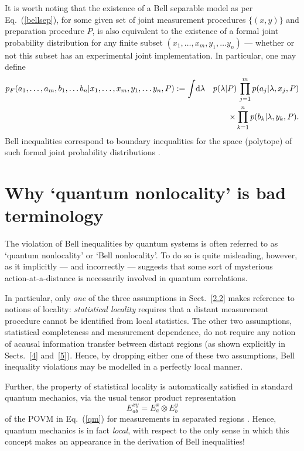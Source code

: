 \documentclass[graybox]{svmult}
\begin{document}
It is worth noting that the existence of a Bell separable model as per Eq.~(\ref{bellsep}), for some given set of joint measurement procedures $\{(x,y)\}$ and preparation procedure $P$, is also equivalent to the existence of a formal joint probability distribution for any finite subset $(x_1,\dots,x_m,y_1,\dots y_n)$ --- whether or not this subset has an experimental joint implementation.  In particular, one  may define \cite{fine}
\begin{eqnarray} \nonumber
p_F(a_1,\dots,a_m,b_1,\dots b_n|x_1,\dots,x_m,y_1,\dots y_n,P) := \int &\mathrm{d} \lambda& p(\lambda|P)\, \prod_{j=1}^m p(a_j|\lambda,x_j,P) \\
&~&~\times\prod_{k=1}^n p(b_k|\lambda,y_k,P) .
\end{eqnarray}
Bell inequalities correspond to boundary inequalities for the space (polytope) of such formal joint probability distributions \cite{bellreview,fineprl,garg,pit}.

\section{Why `quantum nonlocality' is bad terminology}
\label{3}

The violation of Bell inequalities by quantum systems is often referred to as `quantum nonlocality' or `Bell nonlocality'. To do so is quite misleading, however, as it implicitly --- and incorrectly --- suggests that some sort of mysterious action-at-a-distance is necessarily involved in quantum correlations.

In particular, only {\it one} of the three assumptions in Sect.~\ref{2.2} makes reference to notions of locality: {\it statistical locality} requires that a distant measurement procedure cannot be identified from local statistics. The other two assumptions, statistical completeness and measurement dependence, do not require any notion of acausal information transfer between distant regions (as shown explicitly in Sects.~\ref{4} and~\ref{5}).   Hence, by dropping either one of these two assumptions, Bell inequality violations may be modelled in a perfectly local manner.

Further, the property of statistical locality is automatically satisfied in standard quantum mechanics, via the usual tensor product representation
\begin{equation} \label{fact}
 E^{xy}_{ab} = E^x_a\otimes E^y_b 
 \end{equation}
of the POVM in Eq.~(\ref{qm}) for measurements in separated regions \cite{hall91}.  
Hence, quantum mechanics is in fact {\it local}, with respect to the only sense in which this concept makes an appearance in the derivation of Bell inequalities!  
\end{document}
